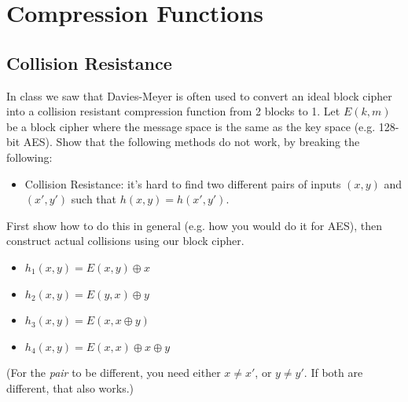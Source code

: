 \documentclass[12pt]{article}
\begin{document}
\newpage
\section{Compression Functions}

\subsection{Collision Resistance}

 
In class we saw that Davies-Meyer is often used to convert an ideal block cipher into a collision resistant compression function from 2 blocks to 1. Let $E(k,m)$ be a block cipher where the message space is the same as the key space (e.g. 128-bit AES). Show that the following methods do not work, by breaking the following:

\begin{itemize}
\item Collision Resistance: it's hard to find two different pairs of inputs $(x, y)$ and $(x', y')$ such that $h(x, y) = h(x', y')$.
\end{itemize}

First show how to do this in general (e.g. how you would do it for AES), then construct actual collisions using our block cipher.

\begin{itemize}
\item $h_1(x, y) = E(x, y) \oplus x$
\item $h_2(x, y) = E(y, x) \oplus y$
\item $h_3(x, y) = E(x, x \oplus y)$
\item $h_4(x, y) = E(x, x) \oplus x \oplus y$
\end{itemize}

(For the \emph{pair} to be different, you need either $x \neq x'$, or $y \neq y'$. If both are different, that also works.)

\end{document}
